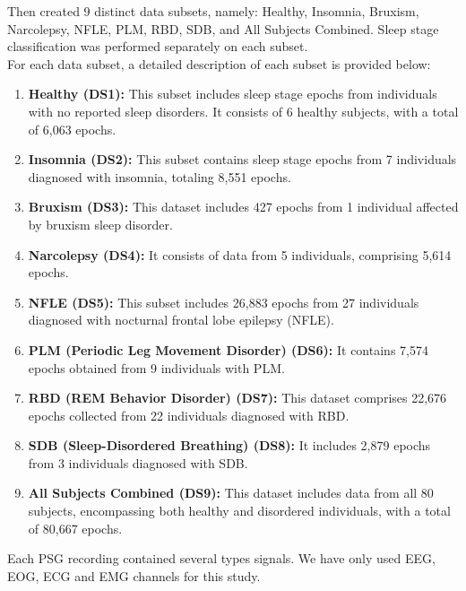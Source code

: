 Then created 9 distinct data subsets, namely: Healthy, Insomnia, Bruxism, Narcolepsy, NFLE, PLM, RBD, SDB, and All Subjects Combined. Sleep stage classification was performed separately on each subset. \\

For each data subset, a detailed description of each subset is provided below:

\begin{enumerate}
    \item \textbf{Healthy (DS1):} This subset includes sleep stage epochs from individuals with no reported sleep disorders. It consists of 6 healthy subjects, with a total of 6,063 epochs.
    
    \item \textbf{Insomnia (DS2):} This subset contains sleep stage epochs from 7 individuals diagnosed with insomnia, totaling 8,551 epochs. 
    
    \item \textbf{Bruxism (DS3):} This dataset includes 427 epochs from 1 individual affected by bruxism sleep disorder. 
    
    \item \textbf{Narcolepsy (DS4):} It consists of data from 5 individuals, comprising 5,614 epochs.
    
    \item \textbf{NFLE (DS5):} This subset includes 26,883 epochs from 27 individuals diagnosed with nocturnal frontal lobe epilepsy (NFLE). 
    
    \item \textbf{PLM (Periodic Leg Movement Disorder) (DS6):} It contains 7,574 epochs obtained from 9 individuals with PLM. 

    \item \textbf{RBD (REM Behavior Disorder) (DS7):} This dataset comprises 22,676 epochs collected from 22 individuals diagnosed with RBD. 

    \item \textbf{SDB (Sleep-Disordered Breathing) (DS8):} It includes 2,879 epochs from 3 individuals diagnosed with SDB. 

    \item \textbf{All Subjects Combined (DS9):} This dataset includes data from all 80 subjects, encompassing both healthy and disordered individuals, with a total of 80,667 epochs. 
    
\end{enumerate}

Each PSG recording contained several types signals. We have only used EEG, EOG, ECG and EMG channels for this study.




